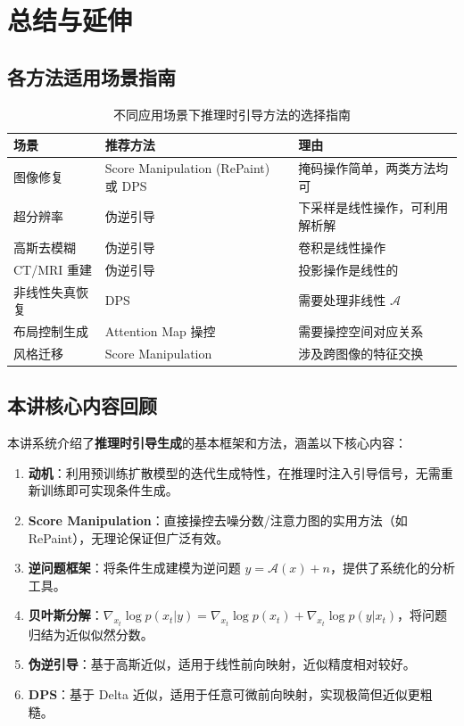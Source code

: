 \documentclass[a4paper]{article}
\begin{document}
\section{总结与延伸}

\subsection{各方法适用场景指南}

\begin{table}[H]
\centering
\begin{tabular}{p{}p{}p{}}
\toprule
\textbf{场景} & \textbf{推荐方法} & \textbf{理由} \\
\midrule
图像修复 & Score Manipulation (RePaint) 或 DPS & 掩码操作简单，两类方法均可 \\
超分辨率 & 伪逆引导 & 下采样是线性操作，可利用解析解 \\
高斯去模糊 & 伪逆引导 & 卷积是线性操作 \\
CT/MRI 重建 & 伪逆引导 & 投影操作是线性的 \\
非线性失真恢复 & DPS & 需要处理非线性 $\mathcal{A}$ \\
布局控制生成 & Attention Map 操控 & 需要操控空间对应关系 \\
风格迁移 & Score Manipulation & 涉及跨图像的特征交换 \\
\bottomrule
\end{tabular}
\caption{不同应用场景下推理时引导方法的选择指南}
\end{table}

\subsection{本讲核心内容回顾}

本讲系统介绍了\textbf{推理时引导生成}的基本框架和方法，涵盖以下核心内容：

\begin{enumerate}
    \item \textbf{动机}：利用预训练扩散模型的迭代生成特性，在推理时注入引导信号，无需重新训练即可实现条件生成。
    \item \textbf{Score Manipulation}：直接操控去噪分数/注意力图的实用方法（如 RePaint），无理论保证但广泛有效。
    \item \textbf{逆问题框架}：将条件生成建模为逆问题 $y = \mathcal{A}(x) + n$，提供了系统化的分析工具。
    \item \textbf{贝叶斯分解}：$\nabla_{x_t} \log p(x_t|y) = \nabla_{x_t} \log p(x_t) + \nabla_{x_t} \log p(y|x_t)$，将问题归结为近似似然分数。
    \item \textbf{伪逆引导}：基于高斯近似，适用于线性前向映射，近似精度相对较好。
    \item \textbf{DPS}：基于 Delta 近似，适用于任意可微前向映射，实现极简但近似更粗糙。
\end{enumerate}
\end{document}
